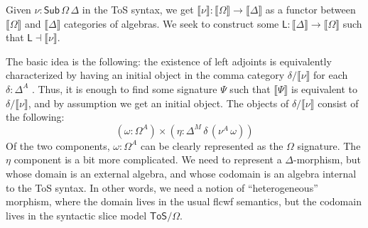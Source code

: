 \documentclass[12pt,a4paper,twoside,openany]{book}
\theoremstyle{remark}
\theoremstyle{definition}
\theoremstyle{theorem}
\newcommand{\ms}[1]{\mathsf{#1}}
\newcommand{\Sub}{\mathsf{Sub}}
\newcommand{\ToS}{\mathsf{ToS}}
\newcommand{\llb}{\llbracket}
\newcommand{\rrb}{\rrbracket}
\newcommand{\sem}[1]{\llb#1\rrb}
\begin{document}
Given $\nu : \Sub\,\Omega\,\Delta$ in the ToS syntax, we get $\sem{\nu} :
\sem{\Omega} \to \sem{\Delta}$ as a functor between $\sem{\Omega}$ and
$\sem{\Delta}$ categories of algebras. We seek to construct some $\ms{L} :
\sem{\Delta} \to \sem{\Omega}$ such that $\ms{L} \dashv \sem{\nu}$.

The basic idea is the following: the existence of left adjoints is equivalently
characterized by having an initial object in the comma category
$\delta/\sem{\nu}$ for each $\delta : \Delta^A$
\cite[Section~IV]{maclane98categories}. Thus, it is enough to find some
signature $\Psi$ such that $\sem{\Psi}$ is equivalent to
$\delta/\sem{\nu}$, and by assumption we get an initial object. The objects
of $\delta/\sem{\nu}$ consist of the following:
\[
  (\omega : \Omega^A) \times (\eta : \Delta^M\,\delta\,(\nu^A\,\omega))
\]
Of the two components, $\omega : \Omega^A$ can be clearly represented as the
$\Omega$ signature. The $\eta$ component is a bit
more complicated. We need to represent a $\Delta$-morphism, but whose domain is
an external algebra, and whose codomain is an algebra internal to the ToS
syntax. In other words, we need a notion of ``heterogeneous'' morphism, where
the domain lives in the usual flcwf semantics, but the codomain lives in the
syntactic slice model $\ToS/\Omega$.
\end{document}
